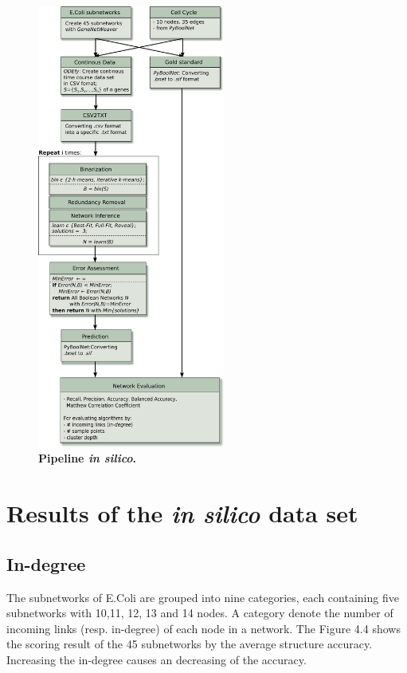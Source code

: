  

\begin{figure}[H]
\centering
\includegraphics[width=0.55\textwidth]{./Bilder/pipeline_insilico.pdf}
\caption[\textit{In silico} Pipeline]{\textbf{Pipeline \textit{in silico}.}}
\label{fig:9}
\end{figure}



\section{Results of the \textit{in silico} data set}
\subsection*{In-degree}
The subnetworks of E.Coli are grouped into nine categories, each containing five subnetworks with 10,11, 12, 13 and 14 nodes. A category denote the number of incoming links (resp. in-degree) of each node in a network. The Figure 4.4 shows the scoring result of the 45 subnetworks by the average structure accuracy. Increasing the in-degree causes an decreasing of the accuracy. 

